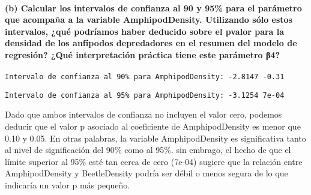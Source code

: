 \documentclass[
]{article}
\begin{document}
\hypertarget{b-calcular-los-intervalos-de-confianza-al-90-y-95-para-el-paruxe1metro-que-acompauxf1a-a-la-variable-amphipoddensity.-utilizando-suxf3lo-estos-intervalos-quuxe9-podruxedamos-haber-deducido-sobre-el-pvalor-para-la-densidad-de-los-anfuxedpodos-depredadores-en-el-resumen-del-modelo-de-regresiuxf3n-quuxe9-interpretaciuxf3n-pruxe1ctica-tiene-este-paruxe1metro-ux3b24}{%
\paragraph{\texorpdfstring{\textbf{(b) Calcular los intervalos de
confianza al 90 y 95\% para el parámetro que acompaña a la variable
AmphipodDensity. Utilizando sólo estos intervalos, ¿qué podríamos haber
deducido sobre el pvalor para la densidad de los anfípodos depredadores
en el resumen del modelo de regresión? ¿Qué interpretación práctica
tiene este parámetro
β4?}}{(b) Calcular los intervalos de confianza al 90 y 95\% para el parámetro que acompaña a la variable AmphipodDensity. Utilizando sólo estos intervalos, ¿qué podríamos haber deducido sobre el pvalor para la densidad de los anfípodos depredadores en el resumen del modelo de regresión? ¿Qué interpretación práctica tiene este parámetro β4?}}\label{b-calcular-los-intervalos-de-confianza-al-90-y-95-para-el-paruxe1metro-que-acompauxf1a-a-la-variable-amphipoddensity.-utilizando-suxf3lo-estos-intervalos-quuxe9-podruxedamos-haber-deducido-sobre-el-pvalor-para-la-densidad-de-los-anfuxedpodos-depredadores-en-el-resumen-del-modelo-de-regresiuxf3n-quuxe9-interpretaciuxf3n-pruxe1ctica-tiene-este-paruxe1metro-ux3b24}}

\begin{verbatim}
Intervalo de confianza al 90% para AmphipodDensity: -2.8147 -0.31 
\end{verbatim}

\begin{verbatim}
Intervalo de confianza al 95% para AmphipodDensity: -3.1254 7e-04 
\end{verbatim}

Dado que ambos intervalos de confianza no incluyen el valor cero,
podemos deducir que el valor p asociado al coeficiente de
AmphipodDensity es menor que 0.10 y 0.05. En otras palabras, la variable
AmphipodDensity es significativa tanto al nivel de significación del
90\% como al 95\%. sin embrago, el hecho de que el límite superior al
95\% esté tan cerca de cero (7e-04) sugiere que la relación entre
AmphipodDensity y BeetleDensity podría ser débil o menos segura de lo
que indicaría un valor p más pequeño.
\end{document}
